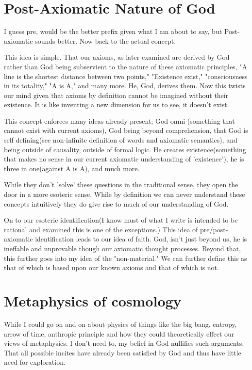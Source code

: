 \section{Post-Axiomatic Nature of God}
\par I guess pre, would be the better prefix given what I am about to say, but Post-axiomatic sounds better. Now back to the actual concept.
\par This idea is simple. That our axioms, as later examined are derived by God rather than God being subservient to the nature of these axiomatic principles, "A line is the shortest distance between two points," "Existence exist," "consciousness in its totality," "A is A," and many more. He, God, derives them. Now this twists our mind given that axioms by definition cannot be imagined without their existence. It is like inventing a new dimension for us to see, it doesn't exist.
\par This concept enforces many ideas already present; God omni-(something that cannot exist with current axioms), God being beyond comprehension, that God is self defining(see non-infinite definition of words and axiomatic semantics), and being outside of causality, outside of formal logic. He creates existence(something that makes no sense in our current axiomatic understanding of 'existence'), he is three in one(against A is A), and much more.
\par While they don't 'solve' these questions in the traditional sense, they open the door in a more esoteric sense. While by definition we can never understand these concepts intuitively they do give rise to much of our understanding of God.
\par On to our esoteric identification(I know must of what I write is intended to be rational and examined this is one of the exceptions.) This idea of pre/post-axiomatic identification leads to our idea of faith. God, isn't just beyond us, he is ineffable and unprovable though our axiomatic thought processes. Beyond that, this further goes into my idea of the "non-material." We can further define this as that of which is based upon our known axioms and that of which is not.
\section{Metaphysics of cosmology}
\par While I could go on and on about physics of things like the big bang, entropy, arrow of time, anthropic principle and how they could theoretically effect our views of metaphysics. I don't need to, my belief in God nullifies such arguments. That all possible incites have already been satisfied by God and thus have little need for exploration.
